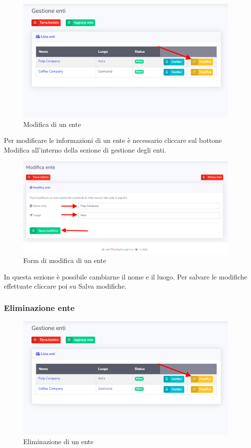 		\begin{figure}[H]
		\centering
		\includegraphics[scale=0.600]{res/images/admin/selModEnte.png}
		\caption{Modifica di un ente}
	\end{figure}

		Per modificare le informazioni di un ente è necessario cliccare sul bottone Modifica all'interno della sezione di gestione degli enti.

		\begin{figure}[H]
		\centering
		\includegraphics[scale=0.600]{res/images/admin/modEnte.png}
		\caption{Form di modifica di un ente}
	\end{figure}

		In questa sezione è possibile cambiarne il nome e il luogo. Per salvare le modifiche effettuate cliccare poi su Salva modifiche.

	\subsubsection{Eliminazione ente}	

		\begin{figure}[H]
		\centering
		\includegraphics[scale=0.600]{res/images/admin/selModEnte.png}
		\caption{Eliminazione di un ente}
	\end{figure}


